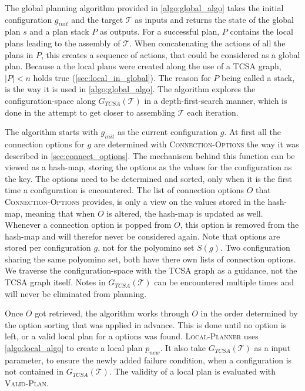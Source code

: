 The global planning algorithm provided in \autoref{algo:global_algo} takes the initial configuration $g_{init}$ and the target $\mathcal{T}$ as inputs and returns the state of the global plan $s$ and a plan stack $P$ as outputs.
For a successful plan, $P$ contains the local plans leading to the assembly of $\mathcal{T}$.
When concatenating the actions of all the plans in $P$, this creates a sequence of actions, that could be considered as a global plan.
Because a the local plans were created along the use of a TCSA graph, $|P| < n$ holds true (\autoref{sec:local_in_global}).
The reason for $P$ being called a stack, is the way it is used in \autoref{algo:global_algo}.
The algorithm explores the configuration-space along $G_{\textit{TCSA}}(\mathcal{T})$ in a depth-first-search manner, which is done in the attempt to get closer to assembling $\mathcal{T}$ each iteration.

The algorithm starts with $g_{init}$ as the current configuration $g$.
At first all the connection options for $g$ are determined with {\scshape Connection-Options} the way it was described in \autoref{sec:connect_options}.
The mechanisem behind this function can be viewed as a hash-map, storing the options as the values for the configuration as the key.
The options need to be determined and sorted, only when it is the first time a configuration is encountered.
The list of connection options $O$ that {\scshape Connection-Options} provides, is only a view on the values stored in the hash-map, meaning that when $O$ is altered, the hash-map is updated as well.
Whenever a connection option is popped from $O$, this option is removed from the hash-map and will therefor never be considered again.
Note that options are stored per configuration $g$, not for the polyomino set $S(g)$.
Two configuration sharing the same polyomino set, both have there own lists of connection options.
We traverse the configuration-space with the TCSA graph as a guidance, not the TCSA graph itself.
Notes in $G_{\textit{TCSA}}(\mathcal{T})$ can be encountered multiple times and will never be eliminated from planning.

Once $O$ got retrieved, the algorithm works through $O$ in the order determined by the option sorting that was applied in advance.
This is done until no option is left, or a valid local plan for a options was found.
{\scshape Local-Planner} uses \autoref{algo:local_algo} to create a local plan $p_{new}$.
It also take $G_{\textit{TCSA}}(\mathcal{T})$ as a input parameter, to ensure the newly added failure condition, when a configuration is not contained in $G_{\textit{TCSA}}(\mathcal{T})$.
The validity of a local plan is evaluated with {\scshape Valid-Plan}.

